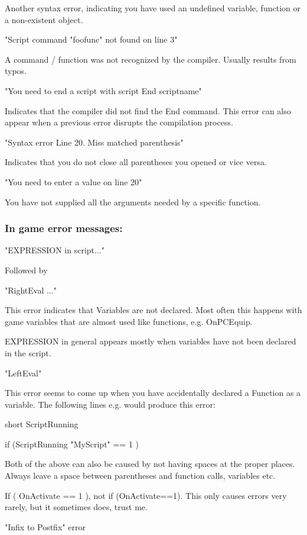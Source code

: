\documentclass[
]{article}
\begin{document}
Another syntax error, indicating you have used an undefined variable,
function or a non-existent object.

"Script command "foofunc" not found on line 3"

A command / function was not recognized by the compiler. Usually results
from typos.

"You need to end a script with script End scriptname"

Indicates that the compiler did not find the End command. This error can
also appear when a previous error disrupts the compilation process.

"Syntax error Line 20. Miss matched parenthesis"

Indicates that you do not close all parentheses you opened or vice
versa.

"You need to enter a value on line 20"

You have not supplied all the arguments needed by a specific function.

\hypertarget{in-game-error-messages}{%
\subsubsection{In game error messages:}\label{in-game-error-messages}}

"EXPRESSION in script..."

Followed by

"RightEval ..."

This error indicates that Variables are not declared. Most often this
happens with game variables that are almost used like functions, e.g.
OnPCEquip.

EXPRESSION in general appears mostly when variables have not been
declared in the script.

"LeftEval"

This error seems to come up when you have accidentally declared a
Function as a variable. The following lines e.g. would produce this
error:

short ScriptRunning

if (ScriptRunning "MyScript" == 1 )

Both of the above can also be caused by not having spaces at the proper
places. Always leave a space between parentheses and function calls,
variables etc.

If ( OnActivate == 1 ), not if (OnActivate==1). This only causes errors
very rarely, but it sometimes does, trust me.

"Infix to Postfix" error
\end{document}
